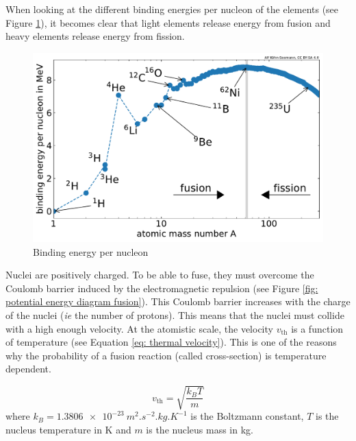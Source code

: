 When looking at the different binding energies per nucleon of the elements (see Figure \ref{fig: binding energy per nucleon}), it becomes clear that light elements release energy from fusion and heavy elements release energy from fission.

\begin{figure} [h]
    \centering
    \includegraphics[width=\linewidth]{Figures/Chapter1/binding_energy_per_nucleon.pdf}
    \caption{Binding energy per nucleon \cite{kohn-seemann_alfkoehnfusion_plots_2021}}
    \label{fig: binding energy per nucleon}
\end{figure}

Nuclei are positively charged.
To be able to fuse, they must overcome the Coulomb barrier induced by the electromagnetic repulsion (see Figure \ref{fig: potential energy diagram fusion}).
This Coulomb barrier increases with the charge of the nuclei (\textit{ie} the number of protons).
This means that the nuclei must collide with a high enough velocity.
At the atomistic scale, the velocity $v_\mathrm{th}$ is a function of temperature (see Equation \ref{eq: thermal velocity}).
This is one of the reasons why the probability of a fusion reaction (called cross-section) is temperature dependent.

\begin{equation}
    v_\mathrm{th} = \sqrt{\frac{k_B T}{m}}
    \label{eq: thermal velocity}
\end{equation}
where $k_B = \SI{1.3806e-23}{m^2.s^{-2}.kg.K^{-1}}$ is the Boltzmann constant, $T$ is the nucleus temperature in \si{K} and $m$ is the nucleus mass in \si{kg}.


